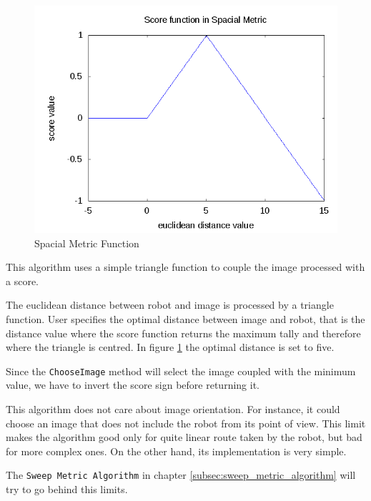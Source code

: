 \begin{figure}[!h]
  \begin{center}
    \includegraphics[width=400pt]{img/spacialMetricFunc.png} 
    \caption{Spacial Metric Function}
    \label{fig:spacial_metric_func}
  \end{center}
\end{figure}

This algorithm uses a simple triangle function to couple the image processed with a score.
%

%
The euclidean distance between robot and image is processed by a triangle function. User specifies
the optimal distance between image and robot, that is the distance value where
the score function returns the maximum tally and therefore where the triangle is centred.
In figure \ref{fig:spacial_metric_func} the optimal distance is set to five.
%

%
Since the \texttt{ChooseImage} method will select the image coupled with the minimum value, we have
to invert the score sign before returning it.
%

%
This algorithm does not care about image orientation. For instance, it could choose an image that
does not include the robot from its point of view. This limit makes the algorithm good only for
quite linear route taken by the robot, but bad for more complex ones. On the other hand, its
implementation is very simple.
%

%
The \texttt{Sweep Metric Algorithm} in chapter \ref{subsec:sweep_metric_algorithm} will try to
go behind this limits.


